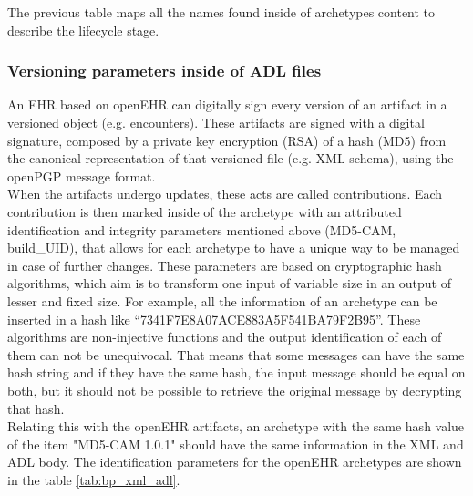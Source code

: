 \documentclass[mim_thesis.tex]{subfiles}
\begin{document}
The previous table maps all the names found inside of archetypes content to describe the lifecycle stage. 

\subsubsection{Versioning parameters inside of ADL files}

An EHR based on openEHR can digitally sign every version of an artifact in a versioned object (e.g. encounters). These artifacts are signed with a digital signature, composed by a private key encryption (RSA) of a hash (MD5) from the canonical representation of that versioned file (e.g. XML schema), using the openPGP message format. \\

When the artifacts undergo updates, these acts are called contributions. Each contribution is then marked inside of the archetype with an attributed identification and integrity parameters mentioned above (MD5-CAM, build\_UID), that allows for each archetype to have a unique way to be managed in case of further changes. These parameters are based on cryptographic hash algorithms, which aim is to transform one input of variable size in an output of lesser and fixed size. For example, all the information of an archetype can be inserted in a hash like “7341F7E8A07ACE883A5F541BA79F2B95”. These algorithms are non-injective functions and the output identification of each of them can not be unequivocal. That means that some messages can have the same hash string and if they have the same hash, the input message should be equal on both, but it should not be possible to retrieve the original message by decrypting that hash. \\

Relating this with the openEHR artifacts, an archetype with the same hash value of the item "MD5-CAM 1.0.1" should have the same information in the XML and ADL body. The identification parameters for the openEHR archetypes are shown in the table \ref{tab:bp_xml_adl}.
\end{document}
